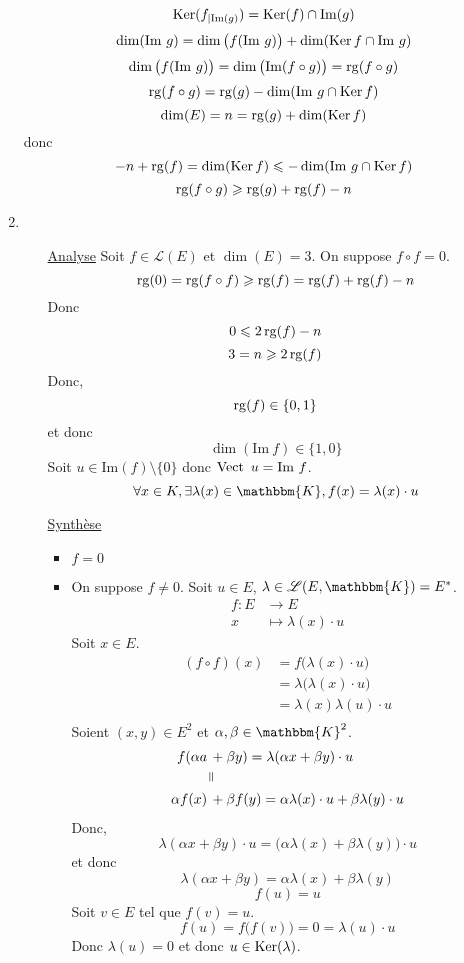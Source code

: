 \begin{enumerate}
		\[
			\operatorname{Ker}(f_{|\mathrm{Im}(g)}) = \operatorname{Ker}(f) \cap \mathrm{Im}(g)
		\]\[
			\dim(\mathrm{Im}\ g) = \dim\big(f(\mathrm{Im}\ g)\big) + \dim(\Ker f \cap \mathrm{Im}\ g)
		\] \[
			\dim\big(f(\mathrm{Im}\ g)\big) = \dim\big(\mathrm{Im}(f \circ g)\big) = \operatorname{rg}(f \circ g)
		\] \[
			\operatorname{rg}(f \circ g) = \operatorname{rg}(g) - \dim(\mathrm{Im}\ g \cap \operatorname{Ker} f)
		\] \[
			\dim(E) = n = \operatorname{rg}(g) + \dim(\operatorname{Ker} f)
		\] donc \[
			-n + \operatorname{rg}(f) = \dim(\operatorname{Ker} f) \leqslant -\dim(\mathrm{Im}\ g \cap \operatorname{Ker} f)
		\] \[
			\operatorname{rg}(f \circ g) \geqslant \operatorname{rg}(g) + \operatorname{rg}(f) - n
		\]
	\item
		\begin{itemize}
			\item[\underline{\sc Analyse}]
				Soit $f \in \mathcal{L}(E)$ et $\dim(E) = 3$. On suppose $f \circ f = 0$.
				\[
					\operatorname{rg}(0) = \operatorname{rg}(f \circ f) \geqslant \operatorname{rg}(f) = \operatorname{rg}(f) + \operatorname{rg}(f) - n
				\] Donc \[
					0 \leqslant 2\operatorname{rg} (f) - n
				\] \[
					3 = n \geqslant 2\operatorname{rg}(f)
				\] Donc, \[
					\operatorname{rg}(f) \in \{0, 1\} 
				\] et donc \[
					\dim(\mathrm{Im}\ f) \in \{1,0\}
				\] 
				Soit $u \in \mathrm{Im}(f) \setminus \{0\}$ donc $\operatorname{Vect}\ u = \mathrm{Im}\ f$. \[
					\forall x \in K, \exists \lambda(x) \in \mathbbm{K}, f(x) = \lambda(x) \cdot u
				\]
			\item[\underline{\sc Synthèse}]~\\
				\begin{itemize}
					\item $f = 0$ 
					\item On suppose $f \neq 0$. Soit $u \in E$, $\lambda \in \mathcal{L}(E, \mathbbm{K}) = E^*$.
						\begin{align*}
							f: E &\longrightarrow E \\
							x &\longmapsto \lambda(x) \cdot u
						\end{align*}
						Soit $x \in E$.
						\begin{align*}
							(f \circ f)(x) &= f\big(\lambda(x) \cdot u\big) \\
							&= \lambda\big(\lambda(x) \cdot u\big) \\
							&= \lambda(x) \lambda(u) \cdot u \\
						\end{align*}
						Soient $(x,y) \in E^2$ et $\alpha, \beta \in \mathbbm{K}^2$.
						\begin{align*}
							f(\alpha a\,&+ \beta y) = \lambda (\alpha x + \beta y) \cdot u\\
												 &\vrt=\\
							\alpha f(x) \,&+ \beta f(y) = \alpha \lambda(x) \cdot u + \beta \lambda(y) \cdot u
						\end{align*}
						Donc, \[
							\lambda(\alpha x + \beta y) \cdot u = \big(\alpha \lambda(x) + \beta \lambda(y)\big) \cdot u
						\] et donc \[
							\lambda (\alpha x + \beta y) = \alpha \lambda(x) + \beta \lambda(y)
						\]
						\[
							f(u) = u
						\] Soit $v \in E$ tel que $f(v) = u$. \[
							f(u) = f\big(f(v)\big) = 0 = \lambda (u) \cdot u
						\] Donc $\lambda(u) = 0$ et donc $u \in \operatorname{Ker}(\lambda)$.
				\end{itemize}
		\end{itemize}
\end{enumerate}

